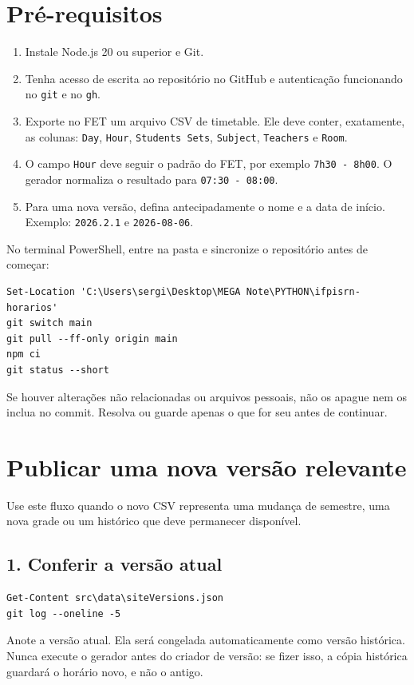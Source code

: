 \documentclass[11pt,a4paper]{article}
\begin{document}
\section{Pré-requisitos}
\begin{enumerate}[leftmargin=*]
  \item Instale Node.js 20 ou superior e Git.
  \item Tenha acesso de escrita ao repositório no GitHub e autenticação funcionando no \texttt{git} e no \texttt{gh}.
  \item Exporte no FET um arquivo CSV de timetable. Ele deve conter, exatamente, as colunas: \texttt{Day}, \texttt{Hour}, \texttt{Students Sets}, \texttt{Subject}, \texttt{Teachers} e \texttt{Room}.
  \item O campo \texttt{Hour} deve seguir o padrão do FET, por exemplo \texttt{7h30 - 8h00}. O gerador normaliza o resultado para \texttt{07:30 - 08:00}.
  \item Para uma nova versão, defina antecipadamente o nome e a data de início. Exemplo: \texttt{2026.2.1} e \texttt{2026-08-06}.
\end{enumerate}

No terminal PowerShell, entre na pasta e sincronize o repositório antes de começar:
\begin{lstlisting}
Set-Location 'C:\Users\sergi\Desktop\MEGA Note\PYTHON\ifpisrn-horarios'
git switch main
git pull --ff-only origin main
npm ci
git status --short
\end{lstlisting}
Se houver alterações não relacionadas ou arquivos pessoais, não os apague nem os inclua no commit. Resolva ou guarde apenas o que for seu antes de continuar.

\section{Publicar uma nova versão relevante}
Use este fluxo quando o novo CSV representa uma mudança de semestre, uma nova grade ou um histórico que deve permanecer disponível.

\subsection{1. Conferir a versão atual}
\begin{lstlisting}
Get-Content src\data\siteVersions.json
git log --oneline -5
\end{lstlisting}
Anote a versão atual. Ela será congelada automaticamente como versão histórica. Nunca execute o gerador antes do criador de versão: se fizer isso, a cópia histórica guardará o horário novo, e não o antigo.
\end{document}

